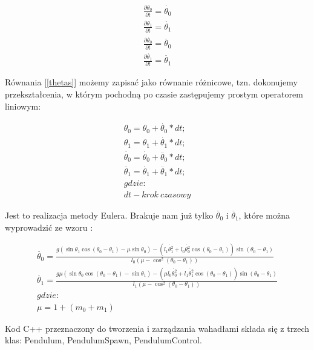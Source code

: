 \documentclass[a4paper,12pt,reqno]{article}
\begin{document}
\begin{equation}
\begin{split} 
\frac{\partial\theta_0}{\partial t}=\dot{\theta_0}
\\
\frac{\partial\theta_1}{\partial t}=\dot{\theta_1}
\\
\frac{\partial\dot{\theta_0}}{\partial t}=\ddot{\theta_0}
\\
\frac{\partial\dot{\theta_1}}{\partial t}=\ddot{\theta_1}
\end{split}
\label{thetas}
\end{equation}

Równania [\ref{thetas}] możemy zapisać jako równanie różnicowe, tzn. dokonujemy przekształcenia, w którym pochodną po czasie zastępujemy prostym operatorem liniowym:

\begin{equation}
\begin{split} 
\theta_0=\theta_0+\dot{\theta_0}*dt;
\\
\theta_1=\theta_1+\dot{\theta_1}*dt;
\\
\dot{\theta_0}=\dot{\theta_0}+\ddot{\theta_0}*dt;
\\
\dot{\theta_1}=\dot{\theta_1}+\ddot{\theta_1}*dt;
\\
gdzie:
\\
dt-krok\ czasowy
\end{split}
\label{pendumalgeb}
\end{equation}

Jest to realizacja metody Eulera. Brakuje nam już tylko $\ddot{\theta_0}$ i $\ddot{\theta_1}$, które można wyprowadzić ze wzoru \cite{double_pendulum}: 

\begin{equation}
\begin{split} 
\ddot{\theta_0}=\frac{g(\sin\theta_1\cos(\theta_0-\theta_1)-\mu\sin\theta_0)
-(l_1\dot{\theta_1^2}+l_0\dot{\theta_0^2}\cos(\theta_0-\theta_1))\sin(\theta_0-\theta_1)}{l_0(\mu-\cos^2(\theta_0-\theta_1))}
\\
\ddot{\theta_1}=\frac{g\mu(\sin\theta_0\cos(\theta_0-\theta_1)-\sin\theta_1)
-(\mu l_0\dot{\theta_0^2}+l_1\dot{\theta_1^2}\cos(\theta_0-\theta_1))\sin(\theta_0-\theta_1)}
{l_1(\mu-\cos^2(\theta_0-\theta_1))}
\\
gdzie:
\\
\mu=1+(m_0+m_1)
\end{split}
\label{computeAngularAcceleration}
\end{equation}

Kod C++ przeznaczony do tworzenia i zarządzania wahadłami składa się z trzech klas: Pendulum, PendulumSpawn, PendulumControl.
\end{document}
